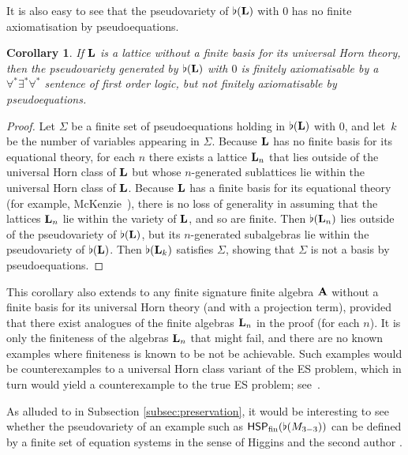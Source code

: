 \documentclass[reqno]{amsart}
\theoremstyle{plain}
\newtheorem{cor}[thm]{Corollary}
\theoremstyle{definition}
\newcommand{\up}[1]{\textup{#1}}
\begin{document}
It is also easy to see that the pseudovariety of $\flat({\bf L})$ with $0$ has no finite axiomatisation by pseudoequations.  
\begin{cor}
If ${\bf L}$ is a lattice without a finite basis for its universal Horn theory\up, then the pseudovariety generated by $\flat({\bf L})$ with $0$ is finitely axiomatisable by a $\forall^*\exists^*\forall^*$ sentence of first order logic, but not finitely axiomatisable by pseudoequations.
\end{cor}
\begin{proof}
Let $\Sigma$ be a finite set of pseudoequations holding in $\flat({\bf L})$ with $0$, and let~$k$ be the number of variables appearing in $\Sigma$.  Because ${\bf L}$ has no finite basis for its equational theory, for each $n$ there exists a lattice ${\bf L}_n$ that lies outside of the universal Horn class of ${\bf L}$ but whose $n$-generated sublattices lie within the universal Horn class of ${\bf L}$.  Because ${\bf L}$ has a finite basis for its equational theory (for example, McKenzie~\cite{mck:lat}), there is no loss of generality in assuming that the lattices ${\bf L}_n$ lie within the variety of ${\bf L}$, and so are finite.  Then $\flat({\bf L}_n)$ lies outside of the pseudovariety of $\flat({\bf L})$, but its $n$-generated subalgebras lie within the pseudovariety of $\flat({\bf L})$.  Then $\flat({\bf L}_k)$ satisfies $\Sigma$, showing that $\Sigma$ is not a basis by pseudoequations.
\end{proof}
This corollary also extends to any finite signature finite algebra ${\bf A}$ without a finite basis for its universal Horn theory (and with a projection term), provided that there exist analogues of the finite algebras ${\bf L}_n$ in the proof (for each $n$).  
It is only the finiteness of the algebras ${\bf L}_n$ that might fail, and there are no known examples where finiteness is known to be not be achievable.  
Such examples would be counterexamples to a universal Horn class variant of the ES problem, which in turn would yield a counterexample to the true ES problem; see~\cite[\S7.4]{jac:flat}.

As alluded to in Subsection \ref{subsec:preservation}, it would be interesting to see whether the pseudovariety of an example such as $\mathsf{HSP}_{\rm fin}(\flat(M_{3{-}3}))$ can be defined by a finite set of equation systems in the sense of Higgins and the second author \cite{higjac,higjac23}.
\end{document}
